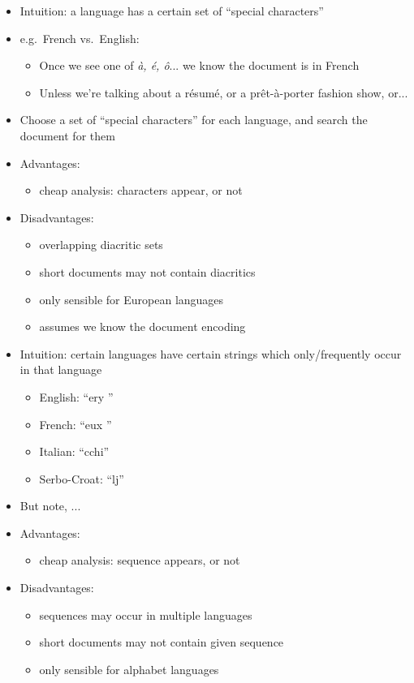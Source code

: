 \documentclass[a4paper,landscape,headrule,footrule,xetex]{foils}
\begin{document}
\begin{itemize}
\item Intuition: a language has a certain set of ``special characters''
\item e.g.\ French vs.\ English:
\begin{itemize}
\item Once we see one of \textit{\`a, \'e, \^o}... we know the document is in French
\item Unless we're talking about a r\'esum\'e, or a pr\^et-\`a-porter fashion show, or...
\end{itemize}
\item Choose a set of ``special characters'' for each language, and
  search the document for them
\item Advantages:
  \begin{itemize}
  \item cheap analysis: characters appear, or not
  \end{itemize}
\item Disadvantages:
  \begin{itemize}
  \item overlapping diacritic sets
  \item short documents may not contain diacritics
  \item only sensible for European languages
  \item assumes we know the document encoding
  \end{itemize}
\end{itemize}





\begin{itemize}
\item Intuition: certain languages have certain strings which only/frequently occur in that language
\begin{itemize}
\item English: ``ery ''
\item French: ``eux ''
\item Italian: ``cchi''
\item Serbo-Croat: ``lj''
\end{itemize}
\item But note, ...

\item Advantages:
  \begin{itemize}
  \item cheap analysis: sequence appears, or not
  \end{itemize}
\item Disadvantages:
  \begin{itemize}
  \item sequences may occur in multiple languages
  \item short documents may not contain given sequence
  \item only sensible for alphabet languages
  \end{itemize}
\end{itemize}
\end{document}
